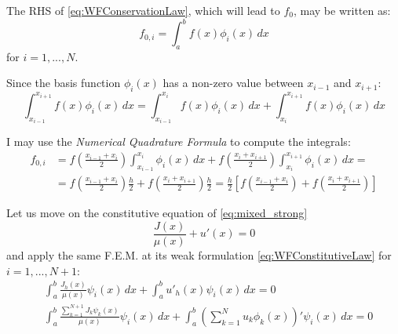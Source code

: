 \documentclass{article}
\begin{document}
The RHS of \eqref{eq:WFConservationLaw}, which will lead to $f_0$, may be written as:
\begin{equation}
    f_{0,i} = \int_a^b f(x) \phi_i(x) \,  dx
\end{equation}
for $i=1,...,N$.

Since the basis function $\phi_i(x)$ has a non-zero value between $x_{i-1}$ and $x_{i+1}$:
\begin{equation}
    \int_{x_{i-1}}^{x_{i+1}} f(x) \phi_i(x) \,  dx = \int_{x_{i-1}}^{x_{i}} f(x) \phi_i(x) \,  dx + \int_{x_{i}}^{x_{i+1}} f(x) \phi_i(x) \,  dx 
\end{equation}

I may use the \textit{Numerical Quadrature Formula} to compute the integrals:
\begin{align*}
    f_{0,i} & =  f\left( \frac{x_{i-1} + x_i }{2} \right) \int_{x_{i-1}}^{x_{i}} \phi_i(x) \,  dx  +  f\left( \frac{x_{i} + x_{i+1} }{2} \right) \int_{x_{i}}^{x_{i+1}} \phi_i(x) \,  dx = \\
     & = f\left( \frac{x_{i-1} + x_i }{2} \right) \frac{h}{2}  +  f\left( \frac{x_{i} + x_{i+1} }{2} \right) \frac{h}{2} = \frac{h}{2} \left[f\left( \frac{x_{i-1} + x_i }{2} \right) + f\left( \frac{x_{i} + x_{i+1} }{2} \right) \right]
\end{align*}



Let us move on the constitutive equation of \eqref{eq:mixed_strong} 
\begin{equation}
    \frac{J(x)}{\mu(x)} + u'(x) = 0
    \label{eq:Constitutive}
\end{equation}
and apply the same F.E.M. at its weak formulation \eqref{eq:WFConstitutiveLaw} for $i=1,...,N+1$: 
\begin{align*}
    &\int_a^b \frac{J_h(x)}{\mu(x)} \psi_i(x) \, dx+ \int_a^b u'_h(x) \psi_i(x) \, dx = 0 \\
    & \int_a^b \frac{\sum_{k=1}^{N+1} J_k \psi_k(x)}{\mu(x)} \psi_i(x) \, dx + \int_a^b \left(\sum_{k=1}^{N} u_k \phi_k(x)\right)' \psi_i(x) \, dx = 0
\end{align*}
\end{document}
